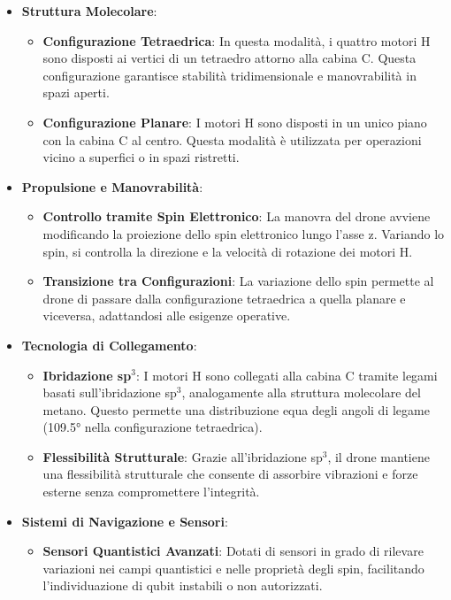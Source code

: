 \begin{tcolorbox}[fontupper=\tiny, fontlower=\Large,colback=white,colframe=black,title=\textbf{CH$_4$ Drones} (\emph{Droni Molecolari di Metano} pt.1)]
\begin{multicols}{2}
\begin{itemize}
    \item \textbf{Struttura Molecolare}:
    \begin{itemize}
        \item \textbf{Configurazione Tetraedrica}: In questa modalità, i quattro motori H sono disposti ai vertici di un tetraedro attorno alla cabina C. Questa configurazione garantisce stabilità tridimensionale e manovrabilità in spazi aperti.
        \item \textbf{Configurazione Planare}: I motori H sono disposti in un unico piano con la cabina C al centro. Questa modalità è utilizzata per operazioni vicino a superfici o in spazi ristretti.
    \end{itemize}
    \item \textbf{Propulsione e Manovrabilità}:
    \begin{itemize}
        \item \textbf{Controllo tramite Spin Elettronico}: La manovra del drone avviene modificando la proiezione dello spin elettronico lungo l'asse z. Variando lo spin, si controlla la direzione e la velocità di rotazione dei motori H.
        \item \textbf{Transizione tra Configurazioni}: La variazione dello spin permette al drone di passare dalla configurazione tetraedrica a quella planare e viceversa, adattandosi alle esigenze operative.
    \end{itemize}
    \item \textbf{Tecnologia di Collegamento}:
    \begin{itemize}
        \item \textbf{Ibridazione sp$^3$}: I motori H sono collegati alla cabina C tramite legami basati sull'ibridazione sp$^3$, analogamente alla struttura molecolare del metano. Questo permette una distribuzione equa degli angoli di legame (109.5° nella configurazione tetraedrica).
        \item \textbf{Flessibilità Strutturale}: Grazie all'ibridazione sp$^3$, il drone mantiene una flessibilità strutturale che consente di assorbire vibrazioni e forze esterne senza compromettere l'integrità.
    \end{itemize}
    \item \textbf{Sistemi di Navigazione e Sensori}:
    \begin{itemize}
        \item \textbf{Sensori Quantistici Avanzati}: Dotati di sensori in grado di rilevare variazioni nei campi quantistici e nelle proprietà degli spin, facilitando l'individuazione di qubit instabili o non autorizzati.

\end{itemize}
\end{itemize}
\end{multicols}
\end{tcolorbox}
